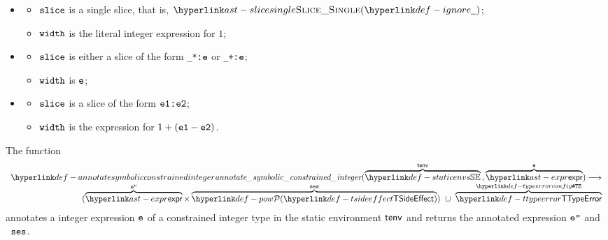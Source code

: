 \ProseParagraph
\OneApplies
\begin{itemize}
  \item {}
  \begin{itemize}
    \item $\texttt{slice}$ is a single slice, that is, $\SliceSingle(\Ignore)$;
    \item $\texttt{width}$ is the literal integer expression for $1$;
  \end{itemize}

  \item {}
  \begin{itemize}
    \item $\texttt{slice}$ is either a slice of the form \texttt{\_*:$\texttt{e}$} or \texttt{\_+:$\texttt{e}$};
    \item $\texttt{width}$ is $\texttt{e}$;
  \end{itemize}

  \item {}
  \begin{itemize}
    \item $\texttt{slice}$ is a slice of the form \texttt{$\texttt{e1}$:$\texttt{e2}$};
    \item $\texttt{width}$ is the expression for $1 + (\texttt{e1} - \texttt{e2})$.
  \end{itemize}
\end{itemize}
\FormallyParagraph
{}

\hypertarget{def-annotatesymbolicconstrainedinteger}{}
The function
\[
\begin{array}{r}
  \annotatesymbolicconstrainedinteger(\overname{\staticenvs}{\tenv} \aslsep \overname{\expr}{\ve}) \aslto\\
  (\overname{\expr}{\vepp} \times \overname{\TSideEffectSet}{\vses})\ \cup\ \overname{\TTypeError}{\TypeErrorConfig}
\end{array}
\]
annotates a \symbolicallyevaluable{} integer expression $\texttt{e}$ of a constrained integer type in the static environment $\textsf{tenv}$
and returns the annotated expression $\texttt{e''}$ and \sideeffectsetterm\ $\texttt{ses}$.
\ProseOtherwiseTypeError

